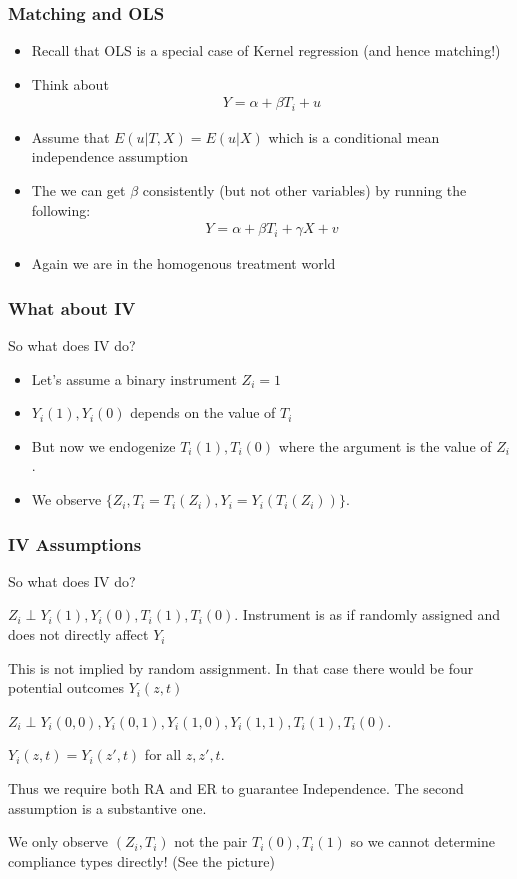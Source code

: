 \documentclass[xcolor=pdftex,dvipsnames,table,mathserif]{beamer}
\begin{document}
\begin{frame}
\frametitle{Matching and OLS}
\begin{itemize}
\item Recall that OLS is a special case of Kernel regression (and hence matching!)
\item Think about
\begin{eqnarray*}
Y  = \alpha + \beta T_i + u
\end{eqnarray*}
\item Assume that $E(u | T,X) = E(u | X)$ which is a conditional mean independence assumption
\item The we can get $\beta$ consistently (but not other variables) by running the following:
\begin{eqnarray*}
Y = \alpha + \beta T_i + \gamma X + v
\end{eqnarray*}
\item Again we are in the homogenous treatment world
\end{itemize}
\end{frame}


\begin{frame}
\frametitle{What about IV}
So what does IV do?
\begin{itemize}
\item Let's assume a binary instrument $Z_i = 1$
\item $Y_i(1),Y_i(0)$ depends on the value of $T_i$
\item But now we endogenize $T_i(1) ,T_i(0)$ where the argument is the value of $Z_i$.
\item We observe $\{Z_i, T_i = T_i(Z_i), Y_i = Y_i(T_i(Z_i)) \}$.
\end{itemize}
\end{frame}

\begin{frame}
\frametitle{IV Assumptions}
So what does IV do?
\begin{description}
\item [Independence] $Z_i \perp Y_i(1), Y_i(0), T_i(1), T_i(0)$. Instrument is as if randomly assigned and does not directly affect $Y_i$
\item This is not implied by random assignment. In that case there would be four potential outcomes $Y_i(z,t)$
\item [Random Assignment] $Z_i \perp Y_i(0,0), Y_i(0,1), Y_i(1,0), Y_i(1,1), T_i(1), T_i(0)$. 
\item [Exclusion Restriction] $Y_i(z,t) = Y_i(z',t)$ for all $z,z',t$. 
\item Thus we require both RA and ER to guarantee Independence. The second assumption is a substantive one.
\item We only observe $(Z_i,T_i)$ not the pair $T_i(0),T_i(1)$ so we cannot determine compliance types directly! (See the picture)
\end{description}
\end{frame}
\end{document}
